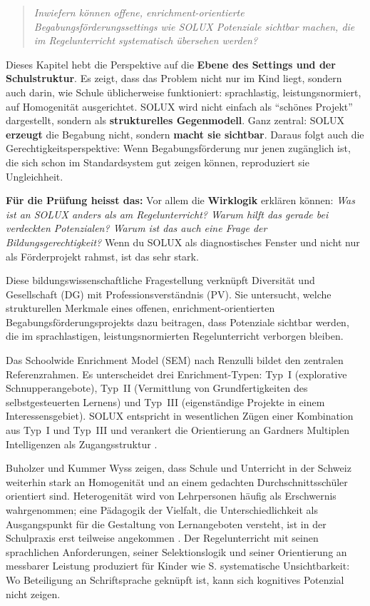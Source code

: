 \documentclass[ngerman, a4paper]{article}
\begin{document}
\begin{quote}\itshape
Inwiefern können offene, enrichment-orientierte Begabungsförderungssettings
wie SOLUX Potenziale sichtbar machen, die im Regelunterricht systematisch
übersehen werden?
\end{quote}

\begin{kapitelueberblick}
Dieses Kapitel hebt die Perspektive auf die \textbf{Ebene des Settings und der Schulstruktur}. Es zeigt, dass das Problem nicht nur im Kind liegt, sondern auch darin, wie Schule üblicherweise funktioniert: sprachlastig, leistungsnormiert, auf Homogenität ausgerichtet. SOLUX wird nicht einfach als \enquote{schönes Projekt} dargestellt, sondern als \textbf{strukturelles Gegenmodell}. Ganz zentral: SOLUX \textbf{erzeugt} die Begabung nicht, sondern \textbf{macht sie sichtbar}. Daraus folgt auch die Gerechtigkeitsperspektive: Wenn Begabungsförderung nur jenen zugänglich ist, die sich schon im Standardsystem gut zeigen können, reproduziert sie Ungleichheit.

\medskip\textbf{Für die Prüfung heisst das:} Vor allem die \textbf{Wirklogik} erklären können: \textit{Was ist an SOLUX anders als am Regelunterricht? Warum hilft das gerade bei verdeckten Potenzialen? Warum ist das auch eine Frage der Bildungsgerechtigkeit?} Wenn du SOLUX als diagnostisches Fenster und nicht nur als Förderprojekt rahmst, ist das sehr stark.
\end{kapitelueberblick}
 
Diese bildungswissenschaftliche Fragestellung verknüpft Diversität und Gesellschaft (DG)
mit Professionsverständnis (PV). Sie untersucht, welche strukturellen Merkmale eines
offenen, enrichment-orientierten Begabungsförderungsprojekts dazu beitragen, dass
Potenziale sichtbar werden, die im sprachlastigen, leistungsnormierten Regelunterricht
verborgen bleiben.
 
Das Schoolwide Enrichment Model (SEM) nach Renzulli bildet den zentralen
Referenzrahmen. Es unterscheidet drei Enrichment-Typen: Typ~I (explorative
Schnupperangebote), Typ~II (Vermittlung von Grundfertigkeiten des selbstgesteuerten
Lernens) und Typ~III (eigenständige Projekte in einem Interessensgebiet). SOLUX
entspricht in wesentlichen Zügen einer Kombination aus Typ~I und Typ~III und verankert
die Orientierung an Gardners Multiplen Intelligenzen als Zugangsstruktur
\parencite{muelleroppliger2021handbuch,fischer2020begabungsfoerderung,trautmann2016einfuehrung}.
 
Buholzer und Kummer Wyss zeigen, dass Schule und Unterricht in der Schweiz weiterhin
stark an Homogenität und an einem gedachten Durchschnittsschüler orientiert sind.
Heterogenität wird von Lehrpersonen häufig als Erschwernis wahrgenommen; eine
Pädagogik der Vielfalt, die Unterschiedlichkeit als Ausgangspunkt für die Gestaltung
von Lernangeboten versteht, ist in der Schulpraxis erst teilweise angekommen
\parencite{buholzer2010allegleich}. Der Regelunterricht mit seinen sprachlichen
Anforderungen, seiner Selektionslogik und seiner Orientierung an messbarer Leistung
produziert für Kinder wie S. systematische Unsichtbarkeit: Wo Beteiligung an Schriftsprache
geknüpft ist, kann sich kognitives Potenzial nicht zeigen.
 
\end{document}
